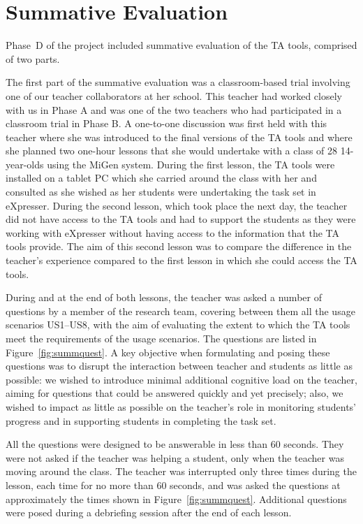 
\section{Summative Evaluation}
\label{sec:summative-evaluation}

Phase~D of the project
included summative evaluation of the TA tools,
comprised of two parts. 

The first part of the summative evaluation was a
classroom-based trial involving one of our teacher collaborators at
her school. This teacher had worked closely with us in Phase A and
was one of the two teachers who had participated in a classroom
trial in Phase B. A one-to-one discussion was first held with this
teacher where she was introduced to the final versions of the TA
tools and where she planned two one-hour lessons that she would
undertake with a class of 28 14-year-olds using the MiGen system.
During the first lesson, the TA tools were installed on a tablet PC
which she carried around the class with her and consulted as she
wished as her students were undertaking the task set in
eXpresser. During the second lesson, which took place the next day,
the teacher did not have access to the TA tools and had to support the
students as they were working with eXpresser without having access to
the information that the TA tools provide. The
aim of this second lesson was to compare the difference in the
teacher's experience compared to the first lesson in which she could
access the TA tools.

During and at the end of both lessons, the teacher was
asked a number of questions by a member of the research team, 
covering between them all the usage scenarios US1--US8, 
with the aim of evaluating the extent to which the TA tools 
meet the requirements of the usage scenarios. 
The questions are listed in Figure~\ref{fig:summquest}. 
A key objective when formulating and posing these questions 
was to disrupt the interaction between teacher and students as little as possible: 
we wished to introduce minimal additional cognitive load 
on the teacher, aiming for questions that could be answered quickly
and yet precisely; 
also, we wished to impact as little as possible on the teacher's role
in monitoring students' progress and in supporting students in
completing the task set. 

All the questions were designed to be
answerable in less than 60 seconds. 
They were not asked if the teacher was helping 
a student, only when the teacher was moving around the class. 
The teacher was interrupted only three times during the lesson, each time for no more
than 60 seconds, and was asked the questions at approximately the times shown in
Figure~\ref{fig:summquest}. 
Additional questions were posed during a debriefing session
after the end of each lesson.


